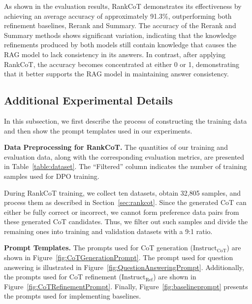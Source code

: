 As shown in the evaluation results, RankCoT demonstrates its effectiveness by achieving an average accuracy of approximately 91.3\%, outperforming both refinement baselines, Rerank and Summary. The accuracy of the Rerank and Summary methods shows significant variation, indicating that the knowledge refinements produced by both models still contain knowledge that causes the RAG model to lack consistency in its answers. In contrast, after applying RankCoT, the accuracy becomes concentrated at either 0 or 1, demonstrating that it better supports the RAG model in maintaining answer consistency.


\subsection{Additional Experimental Details}\label{appendix:aed} In this subsection, we first describe the process of constructing the training data and then show the prompt templates used in our experiments.

\textbf{Data Preprocessing for RankCoT.} The quantities of our training and evaluation data, along with the corresponding evaluation metrics, are presented in Table~\ref{table:dataset}. The ``Filtered'' column indicates the number of training samples used for DPO training.

During RankCoT training, we collect ten datasets, obtain 32,805 samples, and process them as described in Section~\ref{sec:rankcot}. Since the generated CoT can either be fully correct or incorrect, we cannot form preference data pairs from these generated CoT candidates. Thus, we filter out such samples and divide the remaining ones into training and validation datasets with a 9:1 ratio.

\textbf{Prompt Templates.} The prompts used for CoT generation ($\text{Instruct}_\text{CoT}$) are shown in Figure~\ref{fig:CoTGenerationPrompt}. The prompt used for question answering is illustrated in Figure~\ref{fig:QuestionAnsweringPrompt}. Additionally, the prompts used for CoT refinement ($\text{Instruct}_\text{Ref}$) are shown in Figure~\ref{fig:CoTRefinementPrompt}. Finally, Figure~\ref{fig:baselineprompt} presents the prompts used for implementing baselines.






